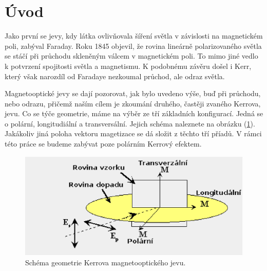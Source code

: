 \chapter*{Úvod}

Jako první se jevy, kdy látka ovlivňovala šíření světla v závislosti na magnetickém poli, zabýval Faraday. Roku 1845 objevil, že rovina lineárně polarizovaného světla se stáčí při průchodu skleněným válcem v magnetickém poli. To mimo jiné vedlo k potvrzení spojitosti světla a magnetismu. K podobnému závěru došel i Kerr, který však narozdíl od Faradaye nezkoumal průchod, ale odraz světla.

Magnetooptické jevy se dají pozorovat, jak bylo uvedeno výše, buď při průchodu, nebo odrazu, přičemž naším cílem je zkoumání druhého, 
častěji zvaného Kerrova, jevu. Co se týče geometrie, máme na výběr ze tří základních konfigurací. Jedná se o polární, longitudiální a 
transversální. Jejich schéma naleznete na obrázku (\ref{schema geo}). Jakákoliv jiná poloha vektoru magetizace se dá 
složit z těchto tří příadů. V rámci této práce se budeme zabývat poze polárním Kerrový efektem.

\begin{figure}
\begin{center}
    \includegraphics[width=5in]{img/polar.eps}
\end{center}
    \caption{Schéma geometrie Kerrova magnetooptického jevu.}
    \label{schema geo}
\end{figure}

